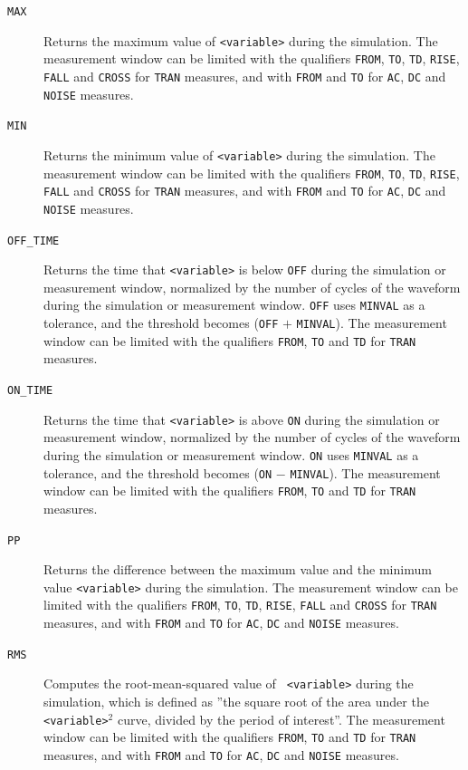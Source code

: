 \begin{Command}
\begin{Arguments}
\begin{description}
  \item[\tt MAX] Returns the maximum value of {\tt <variable>} during
    the simulation.  The measurement window can be limited with the
    qualifiers {\tt FROM}, {\tt TO}, {\tt TD}, {\tt RISE}, {\tt FALL}
    and {\tt CROSS} for {\tt TRAN} measures, and with {\tt FROM} and
    {\tt TO} for {\tt AC}, {\tt DC} and {\tt NOISE} measures.

  \item[\tt MIN] Returns the minimum value of {\tt <variable>} during
    the simulation.  The measurement window can be limited with the
    qualifiers {\tt FROM}, {\tt TO}, {\tt TD}, {\tt RISE}, {\tt FALL}
    and {\tt CROSS} for {\tt TRAN} measures, and with {\tt FROM} and
    {\tt TO} for {\tt AC}, {\tt DC} and {\tt NOISE} measures.

  \item[\tt OFF\_TIME] Returns the time that {\tt <variable>} is below
    {\tt OFF} during the simulation or measurement window, normalized
    by the number of cycles of the waveform during the simulation or
    measurement window.  {\tt OFF} uses {\tt MINVAL} as a tolerance,
    and the threshold becomes ({\tt OFF} $+$ {\tt MINVAL}).  The
    measurement window can be limited with the qualifiers {\tt FROM},
    {\tt TO} and {\tt TD} for {\tt TRAN} measures.

  \item[\tt ON\_TIME] Returns the time that {\tt <variable>} is above
    {\tt ON} during the simulation or measurement window, normalized
    by the number of cycles of the waveform during the simulation or
    measurement window.  {\tt ON} uses {\tt MINVAL} as a tolerance,
    and the threshold becomes ({\tt ON} $-$ {\tt MINVAL}).  The
    measurement window can be limited with the qualifiers {\tt FROM},
    {\tt TO} and {\tt TD} for {\tt TRAN} measures.

  \item[\tt PP] Returns the difference between the maximum value and
    the minimum value {\tt <variable>} during the simulation. The
    measurement window can be limited with the qualifiers {\tt FROM},
    {\tt TO}, {\tt TD}, {\tt RISE}, {\tt FALL} and {\tt CROSS} for
    {\tt TRAN} measures, and with {\tt FROM} and {\tt TO} for {\tt AC},
    {\tt DC} and {\tt NOISE} measures.

  \item[\tt RMS] Computes the root-mean-squared value of {\tt
    <variable>} during the simulation, which is defined as ''the
    square root of the area under the {\tt <variable>$^2$} curve, divided by
    the period of interest''.  The measurement window can be
    limited with the qualifiers {\tt FROM}, {\tt TO} and {\tt TD} for
    {\tt TRAN} measures, and with {\tt FROM} and {\tt TO} for {\tt AC},
    {\tt DC} and {\tt NOISE} measures.


\end{description}
\end{Arguments}
\end{Command}
